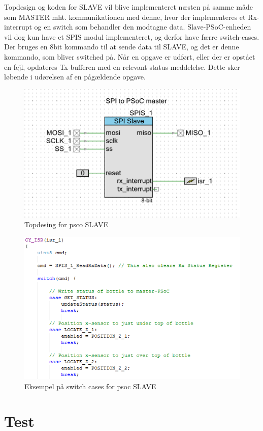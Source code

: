 Topdesign og koden for SLAVE vil blive implementeret næsten på samme måde som MASTER mht. kommunikationen med denne, hvor der implementeres et Rx-interrupt
og en switch som behandler den modtagne data. Slave-PSoC-enheden vil dog kun have et SPIS modul implementeret, og derfor have færre switch-cases.
Der bruges en 8bit kommando til at sende data til SLAVE, og det er denne kommando, som bliver switched på. Når en opgave er udført, eller der er opstået
en fejl, opdateres Tx-bufferen med en relevant status-meddelelse. Dette sker løbende i udørelsen af en pågældende opgave.
\begin{figure}[H]
\includegraphics{Screenshots/PSOC_topdesign_SPIS}
\caption{Topdesing for psco SLAVE}
\end{figure}

\begin{figure}[H]
\includegraphics[scale=0.9]{Screenshots/PSOC_switch_slave}
\caption{Eksempel på switch cases for psoc SLAVE}
\end{figure}     
 
\section{Test}

